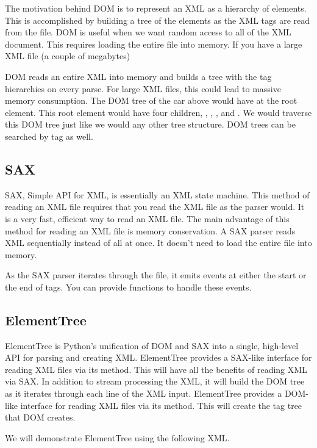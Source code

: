 The motivation behind DOM is to represent an XML as a hierarchy of elements.
This is accomplished by building a tree of the elements as the XML tags are read from the file.
DOM is useful when we want random access to all of the XML document.
This requires loading the entire file into memory.
If you have a large XML file (a couple of megabytes)

DOM reads an entire XML into memory and builds a tree with the tag hierarchies on every parse.
For large XML files, this could lead to massive memory consumption.
The DOM tree of the car above would have  at the root element.
This root element would have four children, , , , and .
We would traverse this DOM tree just like we would any other tree structure.
DOM trees can be searched by tag as well.

\subsection*{SAX}
SAX, Simple API for XML, is essentially an XML state machine.
This method of reading an XML file requires that you read the XML file as the parser would.
It is a very fast, efficient way to read an XML file.
The main advantage of this method for reading an XML file is memory conservation.
A SAX parser reads XML sequentially instead of all at once.
It doesn't need to load the entire file into memory.

As the SAX parser iterates through the file, it emits events at either the start or the end of tags.
You can provide functions to handle these events.


\subsection*{ElementTree}
ElementTree is Python's unification of DOM and SAX into a single, high-level API for parsing and creating XML.
ElementTree provides a SAX-like interface for reading XML files via its  method.
This will have all the benefits of reading XML via SAX.
In addition to stream processing the XML, it will build the DOM tree as it iterates through each line of the XML input.
ElementTree provides a DOM-like interface for reading XML files via its  method.
This will create the tag tree that DOM creates.

We will demonstrate ElementTree using the following XML.


